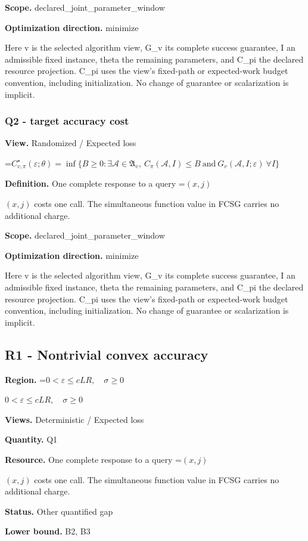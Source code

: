 \documentclass[10pt,a4paper]{article}
\newcommand{\AtlasMath}[1]{\par\begingroup\centering\setbox0=\hbox{$\displaystyle #1$}\ifdim\wd0>1.4\linewidth\typeout{ATLAS WIDE FORMULA: \the\wd0}\fi\ifdim\wd0>\linewidth\resizebox{\linewidth}{!}{\box0}\else\box0\fi\par\endgroup}
\newcommand{\AtlasInlineMath}[1]{\begingroup\setbox0=\hbox{$#1$}\ifdim\wd0>.4\linewidth\endgroup\AtlasMath{#1}\else\endgroup$#1$\fi}
\begin{document}
\textbf{Scope.} declared\_joint\_parameter\_window

\textbf{Optimization direction.} minimize

Here v is the selected algorithm view, G\_v its complete success guarantee, I an admissible fixed instance, theta the remaining parameters, and C\_pi the declared resource projection. C\_pi uses the view's fixed-path or expected-work budget convention, including initialization. No change of guarantee or scalarization is implicit.

\subsubsection{Q2 - target accuracy cost}
\textbf{View.} Randomized / Expected loss

\AtlasMath{C^\star_{v,\pi}(\varepsilon;\theta)=\inf\{B\ge0:\exists\mathcal A\in\mathfrak A_v,\ C_\pi(\mathcal A,I)\le B\ \text{and}\ G_v(\mathcal A,I;\varepsilon)\ \forall I\}}
\textbf{Definition.} One complete response to a query \AtlasInlineMath{(x,j)} costs one call. The simultaneous function value in FCSG carries no additional charge.

\textbf{Scope.} declared\_joint\_parameter\_window

\textbf{Optimization direction.} minimize

Here v is the selected algorithm view, G\_v its complete success guarantee, I an admissible fixed instance, theta the remaining parameters, and C\_pi the declared resource projection. C\_pi uses the view's fixed-path or expected-work budget convention, including initialization. No change of guarantee or scalarization is implicit.

\subsection{R1 - Nontrivial convex accuracy}
\textbf{Region.} \AtlasInlineMath{0<\varepsilon\le cLR,\quad\sigma\ge0}

\textbf{Views.} Deterministic / Expected loss

\textbf{Quantity.} Q1

\textbf{Resource.} One complete response to a query \AtlasInlineMath{(x,j)} costs one call. The simultaneous function value in FCSG carries no additional charge.

\textbf{Status.} Other quantified gap

\textbf{Lower bound.} B2, B3
\end{document}

